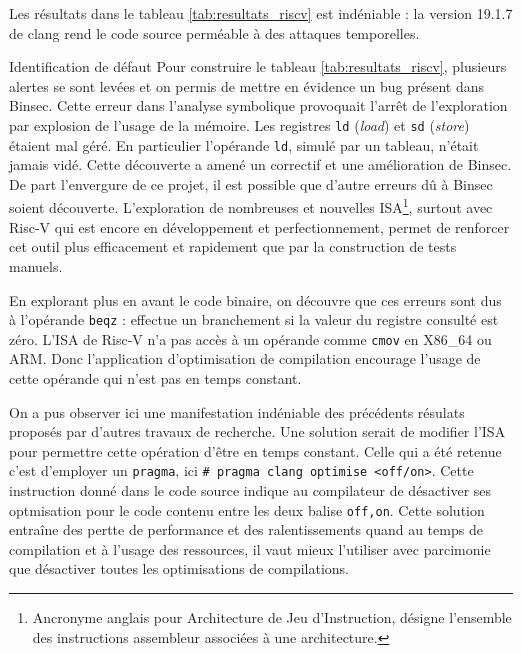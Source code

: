 Les résultats dans le tableau \ref{tab:resultats_riscv} est indéniable : la version 19.1.7 de clang rend le code source perméable à des attaques temporelles.\medbreak

\begin{CitationBox}{Identification de défaut}
    Pour construire le tableau \ref{tab:resultats_riscv}, plusieurs alertes se sont levées et on permis de mettre en évidence un bug présent dans Binsec. Cette erreur dans l'analyse symbolique provoquait l'arrêt de l'exploration par explosion de l'usage de la mémoire. Les registres \texttt{ld} (\textit{load}) et \texttt{sd} (\textit{store}) étaient mal géré. En particulier l'opérande \texttt{ld}, simulé par un tableau, n'était jamais vidé. Cette découverte a amené un correctif et une amélioration de Binsec. De part l'envergure de ce projet, il est possible que d'autre erreurs dû à Binsec soient découverte. L'exploration de nombreuses et nouvelles ISA\footnote{Ancronyme anglais pour Architecture de Jeu d'Instruction, désigne l'ensemble des instructions assembleur associées à une architecture.}, surtout avec Risc-V qui est encore en développement et perfectionnement, permet de renforcer cet outil plus efficacement et rapidement que par la construction de tests manuels.\medbreak
\end{CitationBox}
    
    


En explorant plus en avant le code binaire, on découvre que ces erreurs sont dus à l'opérande \texttt{beqz} : effectue un branchement si la valeur du registre consulté est zéro. L'ISA de Risc-V n'a pas accès à un opérande comme \texttt{cmov} en X86\_64 ou ARM. Donc l'application d'optimisation de compilation encourage l'usage de cette opérande qui n'est pas en temps constant.\medbreak

On a pus observer ici une manifestation indéniable des précédents résulats proposés par d'autres travaux de recherche. Une solution serait de modifier l'ISA pour permettre cette opération d'être en temps constant. Celle qui a été retenue c'est d'employer un \texttt{pragma}, ici \texttt{\# pragma clang optimise <off/on>}. Cette instruction donné dans le code source indique au compilateur de désactiver ses optmisation pour le code contenu entre les deux balise \texttt{off,on}. Cette solution entraîne des pertte de performance et des ralentissements quand au temps de compilation et à l'usage des ressources, il vaut mieux l'utiliser avec parcimonie que désactiver toutes les optimisations de compilations.









